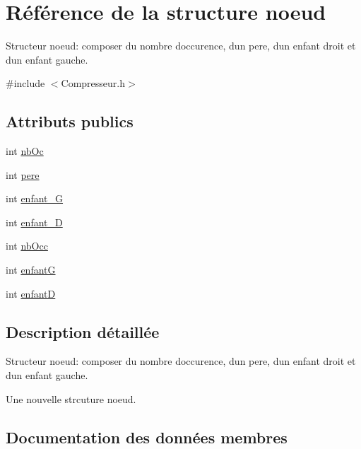 \hypertarget{structnoeud}{}\section{Référence de la structure noeud}
\label{structnoeud}


Structeur noeud\+: composer du nombre d\textquotesingle{}occurence, d\textquotesingle{}un pere, d\textquotesingle{}un enfant droit et d\textquotesingle{}un enfant gauche.  




{\ttfamily \#include $<$Compresseur.\+h$>$}

\subsection*{Attributs publics}
\begin{DoxyCompactItemize}
\item 
int \hyperlink{structnoeud_ae188cbfd3459fb667780ac493b6962ce}{nb\+Oc}
\item 
int \hyperlink{structnoeud_abaa508f22b6e8abe012cd536e7bb8780}{pere}
\item 
int \hyperlink{structnoeud_a9b99f062f42a42d6b9957662a9bc0085}{enfant\+\_\+G}
\item 
int \hyperlink{structnoeud_af6cfb4f928508dd7d4e8ba7d064dade3}{enfant\+\_\+D}
\item 
int \hyperlink{structnoeud_aa5fdf4be5aa9399261d3285eb2444d01}{nb\+Occ}
\item 
int \hyperlink{structnoeud_ad88afdacbf50734c17d45d4600c490b2}{enfantG}
\item 
int \hyperlink{structnoeud_ab437d9987973da58e991bc1d26f99f24}{enfantD}
\end{DoxyCompactItemize}


\subsection{Description détaillée}
Structeur noeud\+: composer du nombre d\textquotesingle{}occurence, d\textquotesingle{}un pere, d\textquotesingle{}un enfant droit et d\textquotesingle{}un enfant gauche. 

Une nouvelle strcuture noeud. 

\subsection{Documentation des données membres}
\mbox{\label{structnoeud_af6cfb4f928508dd7d4e8ba7d064dade3}} 
